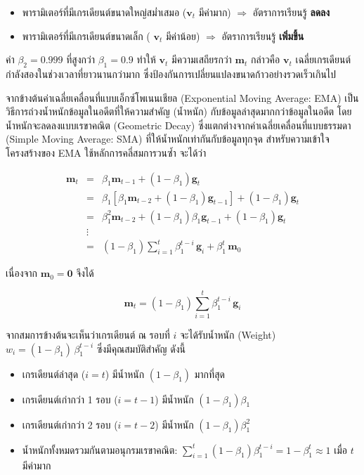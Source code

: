 \begin{itemize}
	\begin{itemize}
		\item[] พารามิเตอร์ที่มีเกรเดียนต์ขนาดใหญ่สม่ำเสมอ ($\mathbf{v}_t$ มีค่ามาก) $\Rightarrow$ อัตราการเรียนรู้ \textbf{ลดลง}
		
		\item[] พารามิเตอร์ที่มีเกรเดียนต์ขนาดเล็ก ( $\mathbf{v}_t$ มีค่าน้อย) $\Rightarrow$ อัตราการเรียนรู้ \textbf{เพิ่มขึ้น}
	\end{itemize}

	ค่า $\beta_2 = 0.999$ ที่สูงกว่า $\beta_1 = 0.9$ ทำให้ $\mathbf{v}_t$ มีความเสถียรกว่า $\mathbf{m}_t$ กล่าวคือ $\mathbf{v}_t$ เฉลี่ยเกรเดียนต์กำลังสองในช่วงเวลาที่ยาวนานกว่ามาก  ซึ่งป้องกันการเปลี่ยนแปลงขนาดก้าวอย่างรวดเร็วเกินไป
\end{itemize}

จากข้างต้นค่าเฉลี่ยเคลื่อนที่แบบเอ็กซ์โพเนนเชียล (Exponential Moving Average: EMA) เป็นวิธีการถ่วงน้ำหนักข้อมูลในอดีตที่ให้ความสำคัญ (น้ำหนัก) กับข้อมูลล่าสุดมากกว่าข้อมูลในอดีต โดยน้ำหนักจะลดลงแบบเรขาคณิต (Geometric Decay) ซึ่งแตกต่างจากค่าเฉลี่ยเคลื่อนที่แบบธรรมดา (Simple Moving Average: SMA) ที่ให้น้ำหนักเท่ากันกับข้อมูลทุกจุด สำหรับความเข้าใจโครงสร้างของ EMA ใช้หลักการคลี่สมการวนซ้ำ จะได้ว่า 

\begin{eqnarray} \nonumber
	\mathbf{m}_t &=& \beta_1 \mathbf{m}_{t-1} + (1 - \beta_1)\mathbf{g}_t \\ \nonumber
	&=& \beta_1 [\beta_1 \mathbf{m}_{t-2} + (1-\beta_1)\mathbf{g}_{t-1}] + (1-\beta_1)\mathbf{g}_t \\ \nonumber
	&=& \beta_1^2 \mathbf{m}_{t-2} + (1-\beta_1)\beta_1\mathbf{g}_{t-1} + (1-\beta_1)\mathbf{g}_t \\ \nonumber
	&\vdots& \\ \nonumber
	&=& (1-\beta_1)\sum_{i=1}^{t}\beta_1^{t-i}\,\mathbf{g}_i + \beta_1^t\,\mathbf{m}_0
\end{eqnarray}

\noindent
เนื่องจาก $\mathbf{m}_0 = \mathbf{0}$ จึงได้

$$\mathbf{m}_t = (1-\beta_1)\sum_{i=1}^{t}\beta_1^{t-i}\,\mathbf{g}_i$$

\noindent
จากสมการข้างต้นจะเห็นว่าเกรเดียนต์ ณ รอบที่ $i$ จะได้รับน้ำหนัก (Weight) $w_i = (1-\beta_1)\,\beta_1^{t-i}$ ซึ่งมีคุณสมบัติสำคัญ ดังนี้

\begin{itemize}
	\item เกรเดียนต์ล่าสุด ($i = t$) มีน้ำหนัก $(1-\beta_1)$ มากที่สุด
	\item เกรเดียนต์เก่ากว่า 1 รอบ ($i = t-1$) มีน้ำหนัก $(1-\beta_1)\beta_1$
	\item เกรเดียนต์เก่ากว่า 2 รอบ ($i = t-2$) มีน้ำหนัก $(1-\beta_1)\beta_1^2$
	\item น้ำหนักทั้งหมดรวมกันตามอนุกรมเรขาคณิต: $\sum_{i=1}^{t} (1-\beta_1)\beta_1^{t-i} = 1 - \beta_1^t \approx 1$ เมื่อ $t$ มีค่ามาก
\end{itemize}


